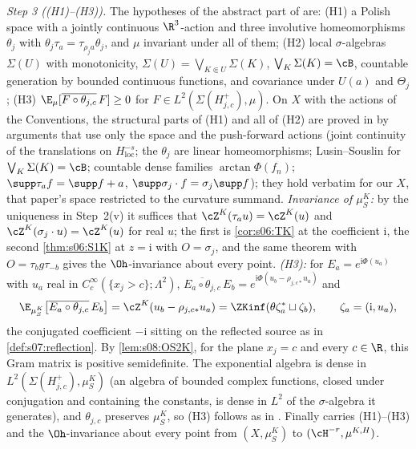 \emph{Step 3 ((H1)--(H3)).} The hypotheses of the abstract part of \cite{SymPhase} are: (H1) a Polish space with a jointly continuous $\R^3$-action and three involutive homeomorphisms $\theta_j$ with $\theta_j\tau_a=\tau_{\rho_ja}\theta_j$, and $\mu$ invariant under all of them; (H2) local $\sigma$-algebras $\Sigma(U)$ with monotonicity, $\Sigma(U)=\bigvee_{K\Subset U}\Sigma(K)$, $\bigvee_K\Sigma(K)=\cB$, countable generation by bounded continuous functions, and covariance under $U(a)$ and $\Theta_j$; (H3) $\E_\mu[\overline{F\circ\theta_{j,c}}\,F]\ge0$ for $F\in L^2(\Sigma(H^+_{j,c}),\mu)$. On $X$ with the actions of the Conventions, the structural parts of (H1) and all of (H2) are proved in \cite[prop:discharge]{SymPhase} by arguments that use only the space and the push-forward actions (joint continuity of the translations on $H^{-s}_{\mathrm{loc}}$; the $\theta_j$ are linear homeomorphisms; Lusin--Souslin for $\bigvee_K\Sigma(K)=\cB$; countable dense families $\arctan\Phi(f_n)$; $\supp\tau_af=\supp f+a$, $\supp\sigma_j\cdot f=\sigma_j\supp f$); they hold verbatim for our $X$, that paper's space restricted to the curvature summand. \emph{Invariance of $\mu^K_S$:} by the uniqueness in Step~2(v) it suffices that $\cZ^K(\tau_au)=\cZ^K(u)$ and $\cZ^K(\sigma_j\cdot u)=\cZ^K(u)$ for real $u$; the first is \cref{cor:s06:TK} at the coefficient $\mathrm i$, the second \cref{thm:s06:S1K} at $z=\mathrm i$ with $O=\sigma_j$, and the same theorem with $O=\tau_bg\tau_{-b}$ gives the $\Oh$-invariance about every point. \emph{(H3):} for $E_a=e^{\mathrm i\Phi(u_a)}$ with $u_a$ real in $C^\infty_c(\{x_j>c\};\Lambda^2)$, $\overline{E_a\circ\theta_{j,c}}\,E_b=e^{\mathrm i\Phi(u_b-\rho_{j,c*}u_a)}$ and
\[
\E_{\mu^K_S}\big[\overline{E_a\circ\theta_{j,c}}\,E_b\big]=\cZ^K(u_b-\rho_{j,c*}u_a)=\ZKinf(\theta\zeta_a^*\sqcup\zeta_b),\qquad\zeta_a=(\mathrm i,u_a),
\]
the conjugated coefficient $-\mathrm i$ sitting on the reflected source as in \cref{def:s07:reflection}. By \cref{lem:s08:OS2K}, for the plane $x_j=c$ and every $c\in\R$, this Gram matrix is positive semidefinite. The exponential algebra is dense in $L^2(\Sigma(H^+_{j,c}),\mu^K_S)$ \cite[lem:A:mc]{SymPhase} (an algebra of bounded complex functions, closed under conjugation and containing the constants, is dense in $L^2$ of the $\sigma$-algebra it generates), and $\theta_{j,c}$ preserves $\mu^K_S$, so (H3) follows as in \cite[prop:discharge]{SymPhase}. Finally \cite[lem:D:hermite(d)]{SymPhase} carries (H1)--(H3) and the $\Oh$-invariance about every point from $(X,\mu^K_S)$ to $(\cH^{-r},\mu^{K,H})$.

